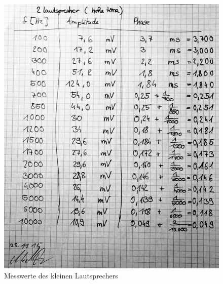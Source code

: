 \documentclass[12pt,oneside,a4paper]{report}
\begin{document}
\begin{figure}
\centering\small
\includegraphics[scale=0.65]{src/2Lautsprecher_Messwerte.jpg}
\caption{Messwerte des kleinen Lautsprechers}
\label{fig:LAUT_HOCH}
\end{figure}

%
%

\end{document}
